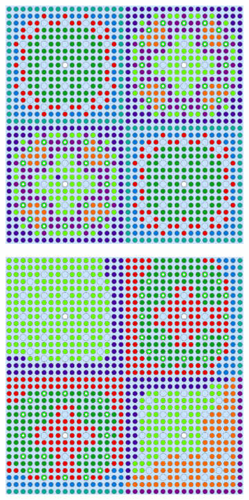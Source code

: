 \documentclass[12pt,twoside]{mitthesis-exec}
\begin{document}
\begin{figure}[h!]
\begin{subfigure}{0.47\textwidth}
  \caption{}
  \label{fig:reflector-2-clusters}
\end{subfigure}
\begin{subfigure}{0.47\textwidth}
  \centering
  \includegraphics[width=0.85\linewidth]{figures/unsupervised/geometries/with-features/4-clusters/combined/2x2}
  \caption{}
  \label{fig:2x2-4-clusters}
\end{subfigure}%
\begin{subfigure}{0.47\textwidth}
  \centering
  \includegraphics[width=0.85\linewidth]{figures/unsupervised/geometries/with-features/4-clusters/combined/reflector}

\end{subfigure}
\end{figure}
\end{document}
